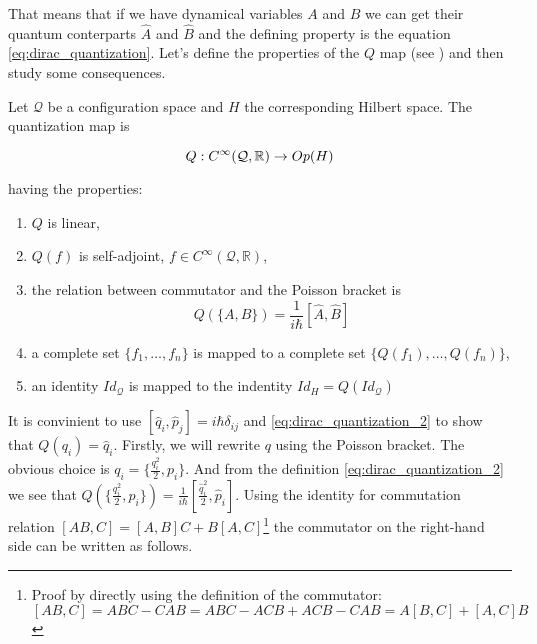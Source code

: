 That means that if we have dynamical variables $A$ and $B$ we can get their quantum conterparts $\hat{A}$ and $\hat{B}$ and the
defining property is the equation \ref{eq:dirac_quantization}. Let's define the properties of the $Q$ map (see \cite{floarin_jung})
and then study some consequences.

\begin{definition}
    \label{df:o_map}

    Let $\mathcal{Q}$ be a configuration space and $H$ the corresponding Hilbert space. The quantization map is

    \begin{equation}
        Q: C^{\infty}(\mathcal{Q}, \mathbb{R}) \to Op(H) \\
    \end{equation}
    
    having the properties:

    \begin{enumerate}
        \item $Q$ is linear,
        \item $Q(f)$ is self-adjoint, $f \in C^{\infty}(\mathcal{Q}, \mathbb{R})$,
        \item the relation between commutator and the Poisson bracket is
            \begin{equation}
                \label{eq:dirac_quantization_2}
                Q(\{A, B\}) = \frac{1}{i \hbar} [\hat{A}, \hat{B}]
            \end{equation}
        \item a complete set $\{f_{1}, \dots, f_{n}\}$ is mapped to a complete set $\{Q(f_{1}), \dots, Q(f_{n})\}$,
        \item an identity $Id_{\mathcal{Q}}$ is mapped to the indentity $Id_{H} = Q(Id_{\mathcal{Q}})$
    \end{enumerate}
\end{definition}

It is convinient to use $[\hat{q}_{i}, \hat{p}_{j}] = i \hbar \delta_{ij}$ and \ref{eq:dirac_quantization_2} to show
that $Q(q_{i}) = \hat{q}_{i}$. Firstly, we will rewrite $q$ using the Poisson bracket. The obvious choice is $q_{i} = \{\frac{q_{i}^{2}}{2}, p_{i}\}$.
And from the definition \ref{eq:dirac_quantization_2} we see that $Q(\{\frac{q_{i}^{2}}{2}, p_{i}\}) = \frac{1}{i \hbar}[\frac{\hat{q}_{i}^{2}}{2}, \hat{p}_{i}]$.
Using the identity for commutation relation $[AB, C] = [A, B]C + B[A, C]$\footnote{Proof by directly using the definition of 
the commutator: $[AB, C] = ABC - CAB = ABC - ACB + ACB - CAB = A [B, C] + [A, C] B$} the commutator on the right-hand side can
be written as follows.

